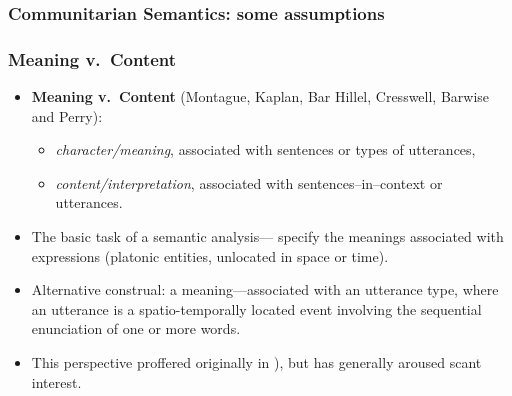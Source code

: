 \documentclass{beamer}
\newcommand{\ignore}[1]{}
\begin{document}
\begin{frame}
\frametitle{Communitarian Semantics: some
    assumptions }

\ignore{
\begin{itemize}

\item {\sf Contextualized Lewisian Regularity}: whenever A utters $S$ 
with meaning $\mu$ in $c$, A communicates that P, where P = $\mu[f]$, 
$f$ is the assignment $c$ provides for $\mu$, and B acquires the 
belief that P. 

\item {\sf Equal Access to Context:}  As a
conversation proceeds a common ground emerges: A has her turn, reaches
a transition relevance point (TRP); Then either A proceeds or B takes
over {\bf from the common ground point at which A spoke.}


\item {\sf The supra-contextual nature of Semantics}: Semantics 
associates meanings with sentences and constituents of sentences.

\end{itemize}
}

\end{frame}

\begin{frame}
\frametitle{ Meaning v.\  Content}

\begin{itemize}
\item {\bf Meaning v.\ Content} (Montague, Kaplan, Bar Hillel, Cresswell, Barwise and Perry):
\begin{itemize} \item {\em
  character/meaning},  associated with sentences or types of
utterances, 

\item {\it content/interpretation},  associated with sentences--in--context or utterances.
\end{itemize}
\pause
\item   The basic task of a
semantic analysis--- specify the meanings associated
with expressions (platonic entities, unlocated in
space or time).  
\ignore{\item A meaning of an expression $E$--- a rule which allows a conversationalist to
calculate, given a context $c$, what content is associated with $E$ in
$c$.  
}
\pause
\item Alternative construal:  a meaning---associated with an utterance type, where an utterance is a
spatio-temporally located event involving the sequential enunciation
of one or more words.
\pause
\item This perspective proffered originally in
\cite{bp83,gp90,cp94,poesio98}), but has generally aroused scant interest.

\end{itemize}
\end{frame}
\end{document}
